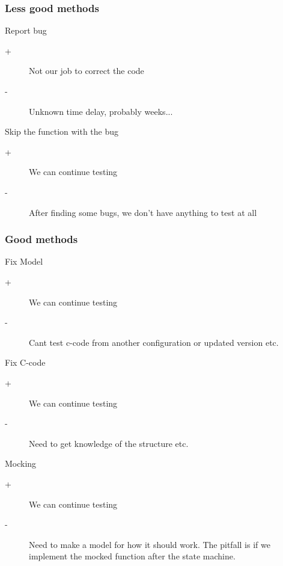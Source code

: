\documentclass{beamer}
\begin{document}
\begin{frame}
  \frametitle{Less good methods}
  \begin{block}{Report bug}
    \begin{description}
      \item[+] Not our job to correct the code
      \item[-] Unknown time delay, probably weeks...
    \end{description}
  \end{block}

  \begin{block}{Skip the function with the bug}
    \begin{description}
      \item[+] We can continue testing
      \item[-] After finding some bugs, we don't have anything to test at all
    \end{description}
  \end{block}
\end{frame}


\begin{frame}
  \frametitle{Good methods}
  \begin{block}{Fix Model}
    \begin{description}
      \item[+] We can continue testing
      \item[-] Cant test c-code from another configuration or updated version etc.
    \end{description}
  \end{block}

  \begin{block}{Fix C-code}
    \begin{description}
      \item[+] We can continue testing
      \item[-] Need to get knowledge of the structure etc.
    \end{description}
  \end{block}

  \begin{block}{Mocking}
    \begin{description}
      \item[+] We can continue testing
      \item[-] Need to make a model for how it should work. The pitfall is if we
        implement the mocked function after the state machine.
    \end{description}
  \end{block}
\end{frame}
\end{document}
